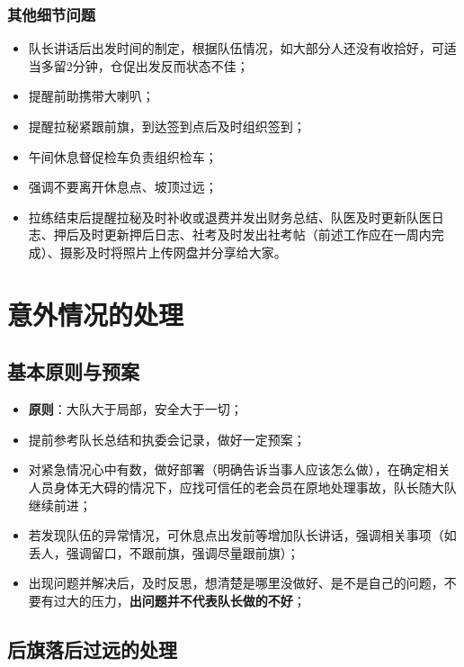 \documentclass[UTF8]{ctexart}
\begin{document}
\subsubsection{其他细节问题}

\begin{itemize}[nosep,left=2em]
    \item 队长讲话后出发时间的制定，根据队伍情况，如大部分人还没有收拾好，可适当多留2分钟，仓促出发反而状态不佳；
    \item 提醒前助携带大喇叭；
    \item 提醒拉秘紧跟前旗，到达签到点后及时组织签到；
    \item 午间休息督促检车负责组织检车；
    \item 强调不要离开休息点、坡顶过远；
    \item 拉练结束后提醒拉秘及时补收或退费并发出财务总结、队医及时更新队医日志、押后及时更新押后日志、社考及时发出社考帖（前述工作应在一周内完成）、摄影及时将照片上传网盘并分享给大家。
\end{itemize}

\section{意外情况的处理}


\subsection{基本原则与预案}
\begin{itemize}[nosep,left=2em]
    \item \textbf{原则}：大队大于局部，安全大于一切；
    \item 提前参考队长总结和执委会记录，做好一定预案；
    \item 对紧急情况心中有数，做好部署（明确告诉当事人应该怎么做），在确定相关人员身体无大碍的情况下，应找可信任的老会员在原地处理事故，队长随大队继续前进；
    \item 若发现队伍的异常情况，可休息点出发前等增加队长讲话，强调相关事项（如丢人，强调留口，不跟前旗，强调尽量跟前旗）；
    \item 出现问题并解决后，及时反思，想清楚是哪里没做好、是不是自己的问题，不要有过大的压力，\textbf{出问题并不代表队长做的不好}；
\end{itemize}

\subsection{后旗落后过远的处理}
\end{document}
